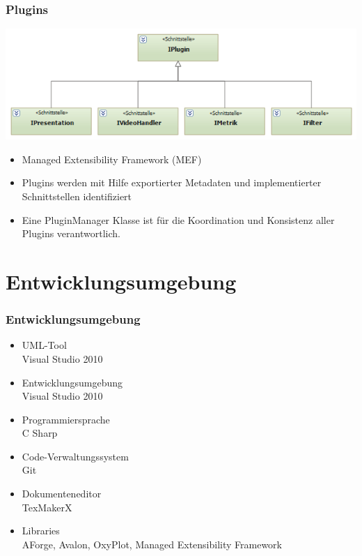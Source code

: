 \documentclass[t]{beamer}
\begin{document}
\begin{frame}
\frametitle{Plugins}
\includegraphics[scale=.5]{img/arch/IPluginStructure.png}
\newline
\newline
\begin{itemize}
\item <+-> Managed Extensibility Framework (MEF)
\item <+-> Plugins werden mit Hilfe exportierter Metadaten und
 implementierter Schnittstellen identifiziert
 \item <+-> Eine PluginManager Klasse ist für die Koordination und Konsistenz aller Plugins verantwortlich.
\end{itemize}
\end{frame}
\section{Entwicklungsumgebung}
\begin{frame}
	\frametitle{Entwicklungsumgebung}
	\begin{itemize}
	\item <+-> UML-Tool\\ Visual Studio 2010
	\item <+-> Entwicklungsumgebung\\ Visual Studio 2010
	\item <+-> Programmiersprache\\ C Sharp
	\item <+-> Code-Verwaltungssystem\\ Git
	\item <+-> Dokumenteneditor\\ TexMakerX
	\item <+-> Libraries\\
				AForge, Avalon, OxyPlot, 
				Managed Extensibility Framework
	\end{itemize}
\end{frame}
\end{document}

